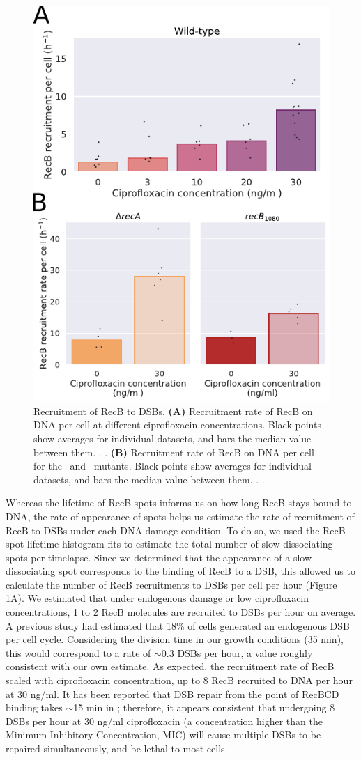 \begin{figure}[htbp]
    \centering
    \includegraphics[width=.4\textwidth]{Figures/Fig3_RecB_recruitment.pdf}
    \caption{Recruitment of RecB to DSBs. \textbf{(A)} Recruitment rate of RecB on DNA per cell at different ciprofloxacin concentrations. Black points show averages for individual datasets, and bars the median value between them. . . \textbf{(B)} Recruitment rate of RecB on DNA per cell for the \dreca\ and \geneteneighty\ mutants. Black points show averages for individual datasets, and bars the median value between them. . .}
    \label{Fig:recruitment}
\end{figure}

Whereas the lifetime of RecB spots informs us on how long RecB stays bound to DNA, the rate of appearance of spots helps us estimate the rate of recruitment of RecB to DSBs under each DNA damage condition. To do so, we used the RecB spot lifetime histogram fits to estimate the total number of slow-dissociating spots per timelapse. Since we determined that the appearance of a slow-dissociating spot corresponds to the binding of RecB to a DSB, this allowed us to calculate the number of RecB recruitments to DSBs per cell per hour (Figure \ref{Fig:recruitment}A). We estimated that under endogenous damage or low ciprofloxacin concentrations, 1 to 2 RecB molecules are recruited to DSBs per hour on average. A previous study had estimated that 18\% of cells generated an endogenous DSB per cell cycle\cite{Sinha2018}. Considering the division time in our growth conditions (35 min), this would correspond to a rate of $\sim$0.3 DSBs per hour, a value roughly consistent with our own estimate. As expected, the recruitment rate of RecB scaled with ciprofloxacin concentration, up to 8 RecB recruited to DNA per hour at 30 ng/ml. It has been reported that DSB repair from the point of RecBCD binding takes $\sim$15 min in \ecoli\cite{Wiktor2021}; therefore, it appears consistent that undergoing 8 DSBs per hour at 30 ng/ml ciprofloxacin (a concentration higher than the Minimum Inhibitory Concentration, MIC) will cause multiple DSBs to be repaired simultaneously, and be lethal to most cells.

